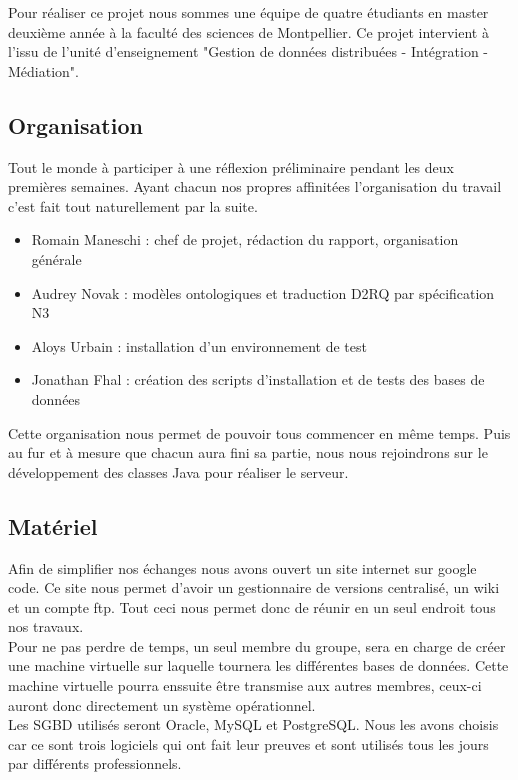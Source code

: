 \documentclass[12pt]{article}
\begin{document}
	Pour réaliser ce projet nous sommes une équipe de quatre étudiants en master deuxième année à la faculté des sciences de Montpellier. Ce projet intervient à l'issu de l'unité d'enseignement "Gestion de données distribuées - Intégration - Médiation".

\subsection{Organisation}

	Tout le monde à participer à une réflexion préliminaire pendant les deux premières semaines.
	Ayant chacun nos propres affinitées l'organisation du travail c'est fait tout naturellement par la suite.\\
	\begin{itemize}
		\item Romain Maneschi : chef de projet, rédaction du rapport, organisation générale\\
		\item Audrey Novak : modèles ontologiques et traduction D2RQ par spécification N3\\
		\item Aloys Urbain : installation d'un environnement de test\\
		\item Jonathan Fhal : création des scripts d'installation et de tests des bases de données\\
	\end{itemize}
	
	Cette organisation nous permet de pouvoir tous commencer en même temps. Puis au fur et à mesure que chacun aura fini sa partie, nous nous rejoindrons sur le développement des classes Java pour réaliser le serveur.

\subsection{Matériel}

	Afin de simplifier nos échanges nous avons ouvert un site internet sur google code. Ce site nous permet d'avoir un gestionnaire de versions centralisé, un wiki et un compte ftp. Tout ceci nous permet donc de réunir en un seul endroit tous nos travaux.\\
	\indent Pour ne pas perdre de temps, un seul membre du groupe, sera en charge de créer une machine virtuelle sur laquelle tournera les différentes bases de données. Cette machine virtuelle pourra enssuite être transmise aux autres membres, ceux-ci auront donc directement un système opérationnel.\\
	\indent Les SGBD utilisés seront Oracle, MySQL et PostgreSQL. Nous les avons choisis car ce sont trois logiciels qui ont fait leur preuves et sont utilisés tous les jours par différents professionnels. 
	
\end{document}
